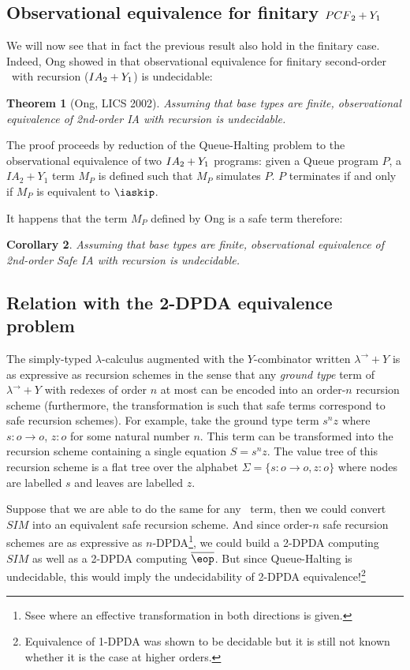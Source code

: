 \documentclass{article}
\newtheorem{theorem}{Theorem}[section]
\newtheorem{corollary}[theorem]{Corollary}
\begin{document}
\subsection{Observational equivalence for finitary ${PCF}_2 + Y_1$}

We will now see that in fact the previous result also hold in the
finitary case. Indeed, Ong showed in \cite{Ong02} that
observational equivalence for finitary second-order \ialgol\ with
recursion (${IA}_2 + Y_1$) is undecidable:
\begin{theorem}[Ong, LICS 2002]
Assuming that base types are finite, observational equivalence of 2nd-order IA with recursion is undecidable.
\end{theorem}

The proof proceeds by reduction of the Queue-Halting problem to the
observational equivalence of two ${IA}_2 + Y_1$ programs: given a
Queue program $P$, a $IA_2 + Y_1$ term $M_P$ is defined such that
$M_P$ simulates $P$. $P$ terminates if and only if $M_P$ is
equivalent to $\iaskip$.

It happens that the term $M_P$ defined by Ong is a safe term
therefore:
\begin{corollary}
Assuming that base types are finite, observational equivalence of 2nd-order Safe IA with recursion is undecidable.
\end{corollary}

\subsection{Relation with the 2-DPDA equivalence problem}

The simply-typed $\lambda$-calculus augmented with the
$Y$-combinator written $\lambda^\rightarrow + Y$ is as expressive as
recursion schemes in the sense that any \emph{ground type} term of
$\lambda^\rightarrow + Y$ with redexes of order $n$ at most can be
encoded into an order-$n$ recursion scheme (furthermore, the
transformation is such that safe terms correspond to safe recursion
schemes). For example, take the ground type term $s^n z$ where
$s:o\rightarrow o$, $z :o$ for some natural number $n$. This term
can be transformed into the recursion scheme containing a single
equation $S = s^n z$. The value tree of this recursion scheme is a
flat tree over the alphabet $\Sigma = \{s:o\rightarrow o, z:o\}$
where nodes are labelled $s$ and leaves are labelled $z$.


Suppose that we are able to do the same for any \pcf\ term, then we
could convert $SIM$ into an equivalent safe recursion scheme. And
since order-$n$ safe recursion schemes are as expressive as
$n$-DPDA\footnote{Ssee \cite{KNU02} where an effective
transformation in both directions is given.}, we could build a
2-DPDA computing $SIM$ as well as a 2-DPDA computing
$\encode{\eop}$. But since Queue-Halting is undecidable, this would
imply the undecidability of 2-DPDA equivalence!\footnote{Equivalence
of 1-DPDA was shown to be decidable but it is still not known
whether it is the case at higher orders.}
\end{document}

